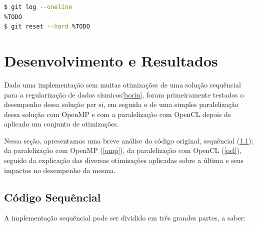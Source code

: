 \documentclass[12pt]{article}
\begin{document}
\begin{lstlisting}[language=bash, caption=Comando para navegar pelas transformações apresentadas no artigo., label=comandogit]
$ git log --oneline
%TODO
$ git reset --hard %TODO
\end{lstlisting}

\section{Desenvolvimento e Resultados} \label{desenvolvimento}

Dado uma implementação sem muitas otimizações de uma solução sequêncial para a regularização de dados sísmicos\ref{borin}, foram primeiramente testados o desempenho dessa solução per si, em seguida o de uma simples paralelização dessa solução com OpenMP e com a paralelização com OpenCL depois de aplicado um conjunto de otimizações.

Nessa seção, apresentamos uma breve análise do código original, sequêncial (\ref{seq}); da paralelização com OpenMP (\ref{omp}), da paralelização com OpenCL (\ref{ocl}), seguido da explicação das diversas otimizações aplicadas sobre a última e seus impactos no desempenho da mesma.

\subsection{Código Sequêncial} \label{seq}

A implementação sequêncial pode ser dividido em três grandes partes, a saber: 
\end{document}
